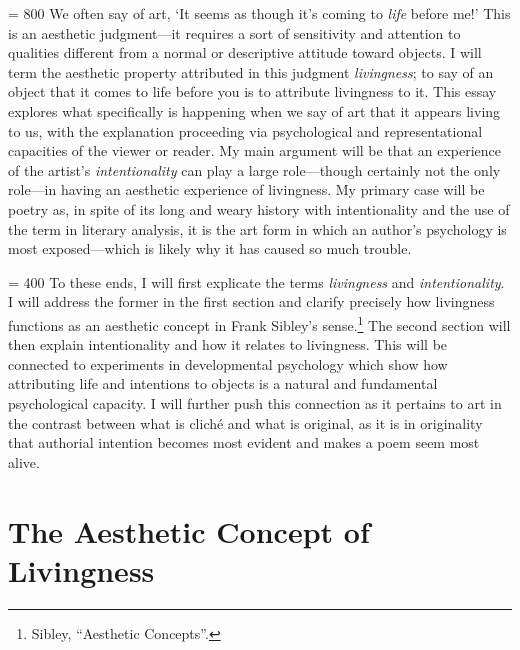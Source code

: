 \pretolerance = 800
\noindent
We often say of art, `It seems as though it's coming to \emph{life}
before me!' This is an aesthetic judgment---it requires a sort of
sensitivity and attention to qualities different from a normal or
descriptive attitude toward objects. I will term the aesthetic property
attributed in this judgment \emph{livingness}; to say of an object that
it comes to life before you is to attribute livingness to it. This essay
explores what specifically is happening when we say of art that it
appears living to us, with the explanation proceeding via psychological
and representational capacities of the viewer or reader. My main
argument will be that an experience of the artist's
\emph{intentionality} can play a large role---though certainly not the
only role---in having an aesthetic experience of livingness. My primary
case will be poetry as, in spite of its long and weary history with
intentionality and the use of the term in literary analysis, it is the
art form in which an author's psychology is most exposed---which is
likely why it has caused so much trouble.

\pretolerance = 400
To these ends, I will first explicate the terms \emph{livingness} and
\emph{intentionality}. I will address the former in the first section
and clarify precisely how livingness functions as an aesthetic concept
in Frank Sibley's sense.\footnote{Sibley, ``Aesthetic Concepts''.} The
second section will then explain intentionality and how it relates to
livingness. This will be connected to experiments in developmental
psychology which show how attributing life and intentions to objects is
a natural and fundamental psychological capacity. I will further push
this connection as it pertains to art in the contrast between what is
cliché and what is original, as it is in originality that authorial
intention becomes most evident and makes a poem seem most alive.

\section{The Aesthetic Concept of Livingness}


